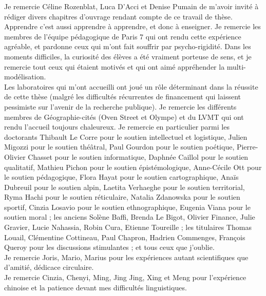Je remercie Céline Rozenblat, Luca D'Acci et Denise Pumain de m'avoir invité à rédiger divers chapitres d'ouvrage rendant compte de ce travail de thèse.
\\



Apprendre c'est aussi apprendre à apprendre, et donc à enseigner. Je remercie les membres de l'équipe pédagogique de Paris 7 qui ont rendu cette expérience agréable, et pardonne ceux qui m'ont fait souffrir par psycho-rigidité. Dans les moments difficiles, la curiosité des élèves a été vraiment porteuse de sens, et je remercie tout ceux qui étaient motivés et qui ont aimé appréhender la multi-modélisation.\\

Les laboratoires qui m'ont accueilli ont joué un rôle déterminant dans la réussite de cette thèse (malgré les difficultés récurrentes de financement qui laissent pessimiste sur l'avenir de la recherche publique). Je remercie les différents membres de Géographie-cités (Oven Street et Olympe) et du LVMT qui ont rendu l'accueil toujours chaleureux. Je remercie en particulier parmi les doctorants Thibault Le Corre pour le soutien intellectuel et logistique, Julien Migozzi pour le soutien théâtral, Paul Gourdon pour le soutien poétique, Pierre-Olivier Chasset pour le soutien informatique, Daphnée Caillol pour le soutien qualitatif, Mathieu Pichon pour le soutien épistémologique, Anne-Cécile Ott pour le soutien pédagogique, Flora Hayat pour le soutien cartographique, Anaïs Dubreuil pour le soutien alpin, Laetita Verhaeghe pour le soutien territorial, Ryma Hachi pour le soutien réticulaire, Natalia Zdanowska pour le soutien sportif, Cinzia Losavio pour le soutien ethnographique, Eugenia Viana pour le soutien moral ; les anciens Solène Baffi, Brenda Le Bigot, Olivier Finance, Julie Gravier, Lucie Nahassia, Robin Cura, Etienne Toureille ; les titulaires Thomas Louail, Clémentine Cottineau, Paul Chapron, Hadrien Commenges, François Queroy pour les discussions stimulantes ; et tous ceux que j'oublie.\\

Je remercie Joris, Mario, Marius pour les expériences autant scientifiques que d'amitié, dédicace circulaire.\\

Je remercie Cinzia, Chenyi, Ming, Jing Jing, Xing et Meng pour l'expérience chinoise et la patience devant mes difficultés linguistiques.\\


